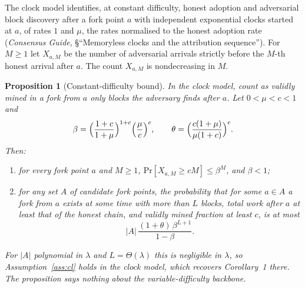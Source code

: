 \documentclass[11pt,a4paper]{article}
\newtheorem{proposition}[theorem]{Proposition}
\theoremstyle{definition}
\renewcommand{\Pr}{\mathrm{Pr}}
\begin{document}
The clock model identifies, at constant difficulty, honest adoption and
adversarial block discovery after a fork point $a$ with independent
exponential clocks started at $a$, of rates $1$ and $\mu$, the rates
normalised to the honest adoption rate (\emph{Consensus Guide},
\S``Memoryless clocks and the attribution sequence''). For $M \ge 1$ let
$X_{a,M}$ be the number of adversarial arrivals strictly before the $M$-th
honest arrival after $a$. The count $X_{a,M}$ is nondecreasing in $M$.

\begin{proposition}[Constant-difficulty bound]\label{prop:const-bound}
In the clock model, count as validly mined in a fork from $a$ only blocks
the adversary finds after $a$. Let $0 < \mu < c < 1$ and
\[
  \beta = \Bigl(\frac{1 + c}{1 + \mu}\Bigr)^{1 + c}
          \Bigl(\frac{\mu}{c}\Bigr)^{c} ,
  \qquad
  \theta = \Bigl(\frac{c (1 + \mu)}{\mu (1 + c)}\Bigr)^{c} .
\]
Then:
\begin{enumerate}[label=(\roman*)]
\item for every fork point $a$ and $M \ge 1$,
  $\Pr[X_{a,M} \ge cM] \le \beta^{M}$, and $\beta < 1$;
\item for any set $A$ of candidate fork points, the probability that for
  some $a \in A$ a fork from $a$ exists at some time with more than $L$
  blocks, total work after $a$ at least that of the honest chain, and
  validly mined fraction at least $c$, is at most
  \[
    |A| \, \frac{(1 + \theta)\, \beta^{L + 1}}{1 - \beta} .
  \]
\end{enumerate}
For $|A|$ polynomial in $\lambda$ and $L = \Theta(\lambda)$ this is
negligible in $\lambda$, so Assumption~\ref{ass:cl} holds in the clock
model, which recovers Corollary~1 there. The proposition says nothing about
the variable-difficulty backbone.
\end{proposition}
\end{document}
